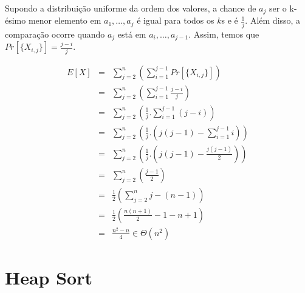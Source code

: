 \begin{example}
   Supondo a distribuição uniforme da ordem dos valores, a chance de $a_j$ ser o k-ésimo menor elemento em $a_1,\dots,a_j$ é igual para todos os $k$s e é $\frac{1}{j}$.
   Além disso, a comparação ocorre quando $a_j$ está em $a_i, \dots, a_{j-1}$.
   Assim, temos que $Pr[\{X_{i,j}\}] = \frac{j-i}{j}$.

   \begin{eqnarray*}
     E[X] & = & \sum_{j=2}^n\left(\sum_{i=1}^{j-1}Pr[\{X_{i,j}\}]\right) \\
     & = & \sum_{j=2}^n\left(\sum_{i=1}^{j-1}\frac{j-i}{j}\right) \\
     & = & \sum_{j=2}^n\left(\frac{1}{j}.\sum_{i=1}^{j-1}(j-i)\right) \\
     & = & \sum_{j=2}^n\left(\frac{1}{j}.\left(j(j-1)-\sum_{i=1}^{j-1}i\right)\right) \\
     & = & \sum_{j=2}^n\left(\frac{1}{j}.\left(j(j-1)-\frac{j(j-1)}{2}\right)\right) \\
     & = & \sum_{j=2}^n\left(\frac{j-1}{2}\right) \\
     & = & \frac{1}{2}\left(\sum_{j=2}^nj - (n-1)\right) \\
     & = & \frac{1}{2}\left(\frac{n(n+1)}{2} - 1 - n+1\right) \\
     & = & \frac{n^2 - n}{4} \in \Theta(n^2)
   \end{eqnarray*}
   
\end{example}



\section{Heap Sort}

